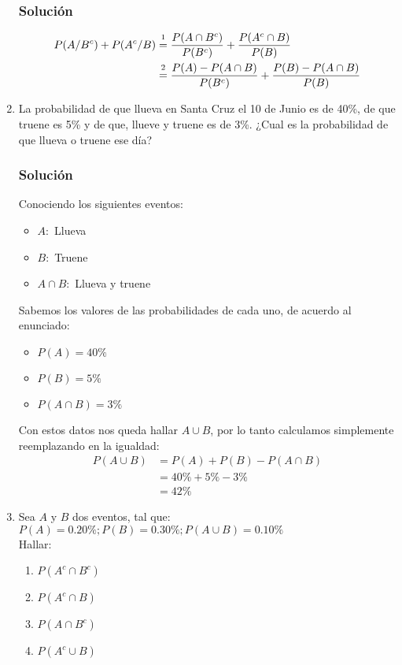 \begin{enumerate}
\subsubsection{Solución}
\begin{align*}
P(A/B^c)+P(A^c/B) &\varstackrel{1}{=} \dfrac{P(A\cap B^c)}{P(B^c)} + \dfrac{P(A^c\cap B)}{P(B)} \\
&\varstackrel{2}{=} \dfrac{P(A)-P(A\cap B)}{P(B^c)}+ \dfrac{P(B)-P(A\cap B)}{P(B)}
\end{align*}
\item La probabilidad de que llueva en Santa Cruz el 10 de Junio es de 40\%, de que truene es 5\% y de que, llueve y truene es de 3\%. ¿Cual es la probabilidad de que llueva o truene ese día?
\subsubsection{Solución}
Conociendo los siguientes eventos:
\begin{itemize}
\item $A:$ Llueva
\item $B:$ Truene
\item $A\cap B:$ Llueva y truene
\end{itemize}
Sabemos los valores de las probabilidades de cada uno, de acuerdo al enunciado:
\begin{itemize}
\item $P(A)=40\%$
\item $P(B)=5\%$
\item $P(A\cap B)=3\%$
\end{itemize}
Con estos datos nos queda hallar $A\cup B$, por lo tanto calculamos simplemente reemplazando en la igualdad:
\begin{align*}
 P(A\cup B) &= P(A)+P(B)-P(A\cap B)\\
 	      &= 40\% + 5\% - 3\%    \\
 	      	&= 42\%
\end{align*}
\item Sea $A$ y $B$ dos eventos, tal que: $P(A)=0.20\% ; P(B)=0.30\%;P(A\cup B)=0.10\%$ \\ Hallar:
\begin{enumerate}
\item $P(A^c\cap B^c)$
\item $P(A^c\cap B)$
\item $P(A\cap B^c)$
\item $P(A^c\cup B)$
\end{enumerate}



\end{enumerate}
